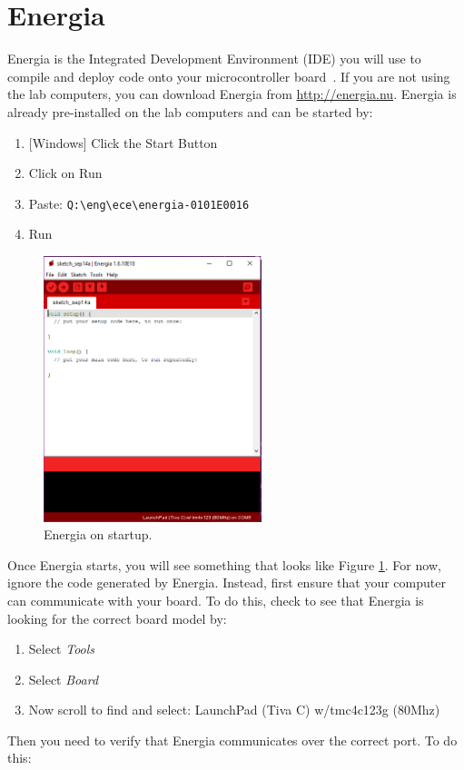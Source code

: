 \documentclass{article}
\begin{document}
\section*{Energia}
Energia is the Integrated Development Environment (IDE) you will use to compile and deploy code onto your microcontroller board~\cite{energia}.  If you are not using the lab computers, you can download Energia from \url{http://energia.nu}.  Energia is already pre-installed on the lab computers and can be started by:
\begin{enumerate}
	\item {[Windows] Click the Start Button}
	\item Click on Run
	\item Paste: \texttt{Q:\textbackslash eng\textbackslash ece\textbackslash energia-0101E0016}
	\item Run
\end{enumerate}
\begin{figure}[ht]
\centering
\includegraphics[width=2.5in]{Images/Energia.PNG}
\caption{Energia on startup.}
\label{fig:energiaStart}
\end{figure}
Once Energia starts, you will see something that looks like Figure \ref{fig:energiaStart}. For now, ignore the code generated by Energia. Instead, first ensure that your computer can communicate with your board. To do this, check to see that Energia is looking for the correct board model by:
\begin{enumerate}
	\item Select \emph{Tools}
	\item Select \emph{Board}
	\item Now scroll to find and select: LaunchPad (Tiva C) w/tmc4c123g (80Mhz)
\end{enumerate}
Then you need to verify that Energia communicates over the correct port. To do this:
\end{document}
